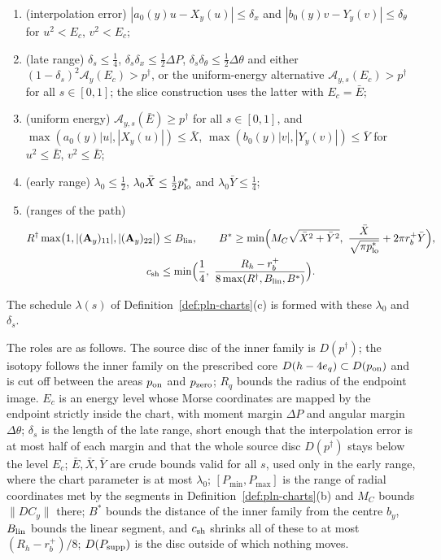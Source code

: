 \begin{definition}
\begin{enumerate}[label=(D\arabic*)]
 \[
  \Delta P\le p^*(y)+X_y(u)\le h-\Delta P,\qquad p^*(y)+X_y(u)\le\pi R_q^2<h,\qquad |Y_y(v)|\le\tfrac12-\Delta\theta ;
 \]
\item\label{it:pln-D3} (interpolation error) $|a_0(y)u-X_y(u)|\le\delta_x$ and $|b_0(y)v-Y_y(v)|\le \delta_\theta$ for $u^2<E_c$, $v^2<E_c$;
\item\label{it:pln-D4} (late range) $\delta_s\le\frac14$, $\delta_s\delta_x\le\frac12\Delta P$, $\delta_s\delta_\theta\le\frac12\Delta\theta$ and
 either $(1-\delta_s)^2\mathcal A_y(E_c)>p^\dagger$, or the
 uniform-energy alternative $\mathcal A_{y,s}(E_c)>p^\dagger$ for all $s\in[0,1]$;
 the slice construction uses the latter with $E_c=\bar E$;
\item\label{it:pln-D5} (uniform energy) $\mathcal A_{y,s}(\bar E)\ge p^\dagger$ for all $s\in[0,1]$, and
 $\max(a_0(y)|u|,|X_y(u)|)\le\bar X$, $\max(b_0(y)|v|,|Y_y(v)|)\le\bar Y$ for $u^2\le\bar E$, $v^2\le\bar E$;
\item\label{it:pln-D6} (early range) $\lambda_0\le\frac12$, $\lambda_0\bar X\le\frac12p^*_{\rm lo}$ and $\lambda_0\bar Y\le\frac14$;
\item\label{it:pln-D7} (ranges of the path)
 \begin{gather*}
  R^\dagger\max\bigl(1,|(\mathbf A_y)_{11}|,|(\mathbf A_y)_{22}|\bigr)\le B_{\rm lin},\qquad
  B^*\ge\min\Bigl(M_C\sqrt{\bar X^2+\bar Y^2},\ \frac{\bar X}{\sqrt{\pi p^*_{\rm lo}}}+2\pi r_b^+\bar Y\Bigr),\\
  c_{\rm sh}\le\min\Bigl(\frac14,\ \frac{R_h-r_b^+}{8\max(R^\dagger,B_{\rm lin},B^*)}\Bigr).
 \end{gather*}
\end{enumerate}
The schedule $\lambda(s)$ of Definition~\ref{def:pln-charts}(c) is formed with these $\lambda_0$ and $\delta_s$.
\end{definition}

The roles are as follows. The source disc of the inner family is $D(p^\dagger)$; the isotopy follows the inner
family on the prescribed core $D(h-4e_q)\subset D(p_{\rm on})$ and is cut off between the areas $p_{\rm on}$ and $p_{\rm zero}$; $R_q$ bounds the radius
of the endpoint image. $E_c$ is an energy level whose Morse coordinates are mapped by the endpoint
strictly inside the chart, with moment margin $\Delta P$ and angular margin $\Delta\theta$; $\delta_s$ is the length
of the late range, short enough that the interpolation error is at most half of each margin and that the
whole source disc $D(p^\dagger)$ stays below the level $E_c$; $\bar E,\bar X,\bar Y$ are crude bounds valid for all
$s$, used only in the early range, where the chart parameter is at most $\lambda_0$; $[P_{\min},P_{\max}]$ is the
range of radial coordinates met by the segments in Definition~\ref{def:pln-charts}(b) and $M_C$ bounds
$\|DC_y\|$ there; $B^*$ bounds the distance of the inner family from the centre $b_y$, $B_{\rm lin}$ bounds the linear
segment, and $c_{\rm sh}$ shrinks all of these to at most $(R_h-r_b^+)/8$; $D(P_{\rm supp})$ is the disc outside of which
nothing moves.

